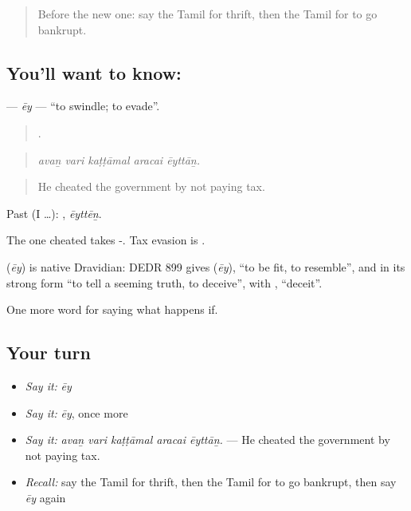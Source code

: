 \label{lesson:TA-C548-ey}



\begin{quote}
Before the new one: say the Tamil for thrift, then the Tamil for to go bankrupt.
\end{quote}

\subsection*{You'll want to know: }
\textbf{} — \emph{ēy} — \textquotedblleft{}to swindle; to evade\textquotedblright{}.

\begin{quote}
    .
\end{quote}

\begin{quote}
\emph{avaṉ vari kaṭṭāmal aracai ēyttāṉ.}
\end{quote}

\begin{quote}
He cheated the government by not paying tax.
\end{quote}

Past (I …): , \emph{ēyttēṉ}.

The one cheated takes -. Tax evasion is  .

\begin{cousinweb}
\textbf{} (\emph{ēy}) is native Dravidian: DEDR 899 gives  (\emph{ēy}), \textquotedblleft{}to be fit, to resemble\textquotedblright{}, and in its strong form \textquotedblleft{}to tell a seeming truth, to deceive\textquotedblright{}, with , \textquotedblleft{}deceit\textquotedblright{}.
\end{cousinweb}

\begin{grammarlens}[title={What you've built}]
One more word for saying what happens if.
\end{grammarlens}

\subsection*{Your turn}
\begin{itemize}
\raggedright
  \item \emph{Say it:} \emph{ēy}
  \item \emph{Say it:} \emph{ēy}, once more
  \item \emph{Say it:} \emph{avaṉ vari kaṭṭāmal aracai ēyttāṉ.} — He cheated the government by not paying tax.
  \item \emph{Recall:} say the Tamil for thrift, then the Tamil for to go bankrupt, then say \emph{ēy} again
\end{itemize}

